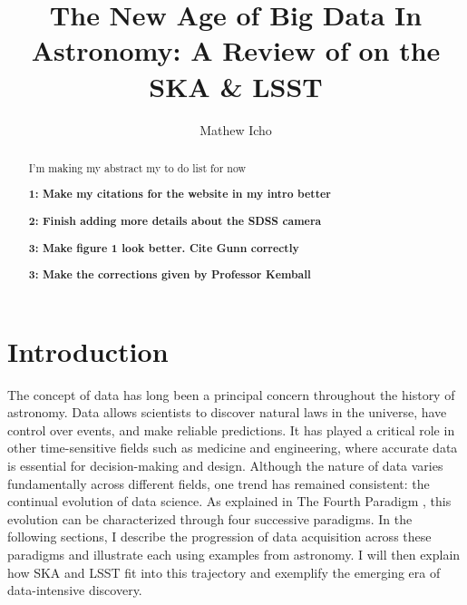\documentclass[preprint,linenumbers, longauthor]{aastex631}
\begin{document}
\title{The New Age of Big Data In Astronomy: A Review of on the SKA \& LSST}
\author{Mathew Icho}

\begin{abstract}
I'm making my abstract my to do list for now

\textbf{1: Make my citations for the website in my intro better}

\textbf{2: Finish adding more details about the SDSS camera}

\textbf{3: Make figure 1 look better. Cite Gunn correctly}

\textbf{3: Make the corrections given by Professor Kemball}


\end{abstract}

\tableofcontents

\section{Introduction}
The concept of data has long been a principal concern throughout the history of astronomy. Data allows scientists to discover natural laws in the universe, have control over events, and make reliable predictions. It has played a critical role in other time-sensitive fields such as medicine and engineering, where accurate data is essential for decision-making and design. Although the nature of data varies fundamentally across different fields, one trend has remained consistent: the continual evolution of data science. As explained in The Fourth Paradigm \citep{heyFourthParadigmDataIntensive2009}, this evolution can be characterized through four successive paradigms. In the following sections, I describe the progression of data acquisition across these paradigms and illustrate each using examples from astronomy. I will then explain how SKA and LSST fit into this trajectory and exemplify the emerging era of data-intensive discovery.
\end{document}
